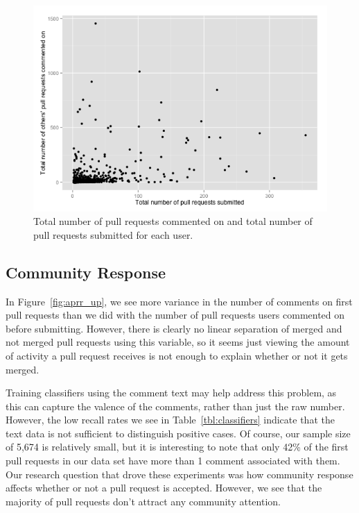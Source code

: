 \documentclass{sigchi}
\begin{document}
\begin{figure}[p] \centering
\includegraphics[scale=0.6]{figures/commented_pullrequests_totals_ggplot.png}
\caption{Total number of pull requests commented on and total number of pull
requests submitted for each user.} \label{fig:commented_pullrequests_totals}
\end{figure}

\subsection{Community Response}
In Figure~\ref{fig:aprr_up}, we see more variance in the number of comments on
first pull requests than we did with the number of pull requests users commented
on before submitting. However, there is clearly no linear separation of merged
and not merged pull requests using this variable, so it seems just viewing the
amount of activity a pull request receives is not enough to explain whether or
not it gets merged.

Training classifiers using the comment text may help address this problem, as
this can capture the valence of the comments, rather than just the raw number.
However, the low recall rates we see in Table~\ref{tbl:classifiers} indicate
that the text data is not sufficient to distinguish positive cases. Of course,
our sample size of 5,674 is relatively small, but it is interesting to note that
only 42\% of the first pull requests in our data set have more than 1 comment
associated with them. Our research question that drove these experiments was how
community response affects whether or not a pull request is accepted. However,
we see that the majority of pull requests don't attract any community attention.
\end{document}
